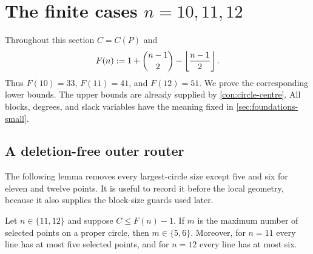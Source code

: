 ﻿\section{The finite cases \texorpdfstring{$n=10,11,12$}{n=10,11,12}}
\label{sec:finite-n10-n12}

Throughout this section $C=C(P)$ and
\[
 F(n):=1+\binom{n-1}{2}-\left\lfloor \frac{n-1}{2}\right\rfloor.
\]
Thus $F(10)=33$, $F(11)=41$, and $F(12)=51$.  We prove the
corresponding lower bounds.  The upper bounds are already supplied by
\cref{con:circle-centre}.  All blocks, degrees, and slack variables have
the meaning fixed in \cref{sec:foundations-small}.

\subsection{A deletion-free outer router}

The following lemma removes every largest-circle size except five and six
for eleven and twelve points.  It is useful to record it before the local
geometry, because it also supplies the block-size guards used later.

\begin{lemma}\label{lem:n11-n12-outer-router}
Let $n\in\{11,12\}$ and suppose $C\le F(n)-1$.  If $m$ is the maximum
number of selected points on a proper circle, then $m\in\{5,6\}$.  Moreover,
for $n=11$ every line has at most five selected points, and for $n=12$
every line has at most six.
\end{lemma}

